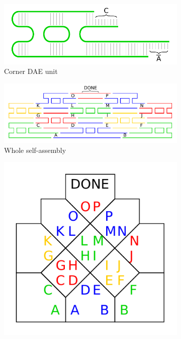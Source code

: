 \begin{figure}[h]
\begin{center}
	\begin{subfigure}[b]{0.31\textwidth}
		\includegraphics[width=\textwidth]{./figures/tile_model/DNA_struct.pdf} %
		\caption{Corner DAE unit}
		\label{fig:DNA_struct}
	\end{subfigure}%
	\begin{subfigure}[b]{0.472\textwidth}
		\includegraphics[width=\textwidth]{./figures/tile_model/DNA_assembly.pdf} %
		\caption{Whole self-assembly}
		\label{fig:DNA_assembly}
	\end{subfigure}
	\begin{subfigure}[b]{0.190\textwidth}
		\includegraphics[width=\textwidth]{./figures/tile_model/abstract_model.pdf} %

\end{subfigure}
\end{center}
\end{figure}
